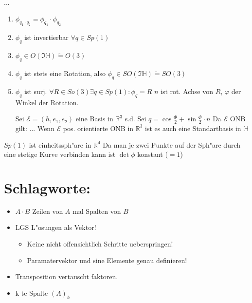\documentclass[oneside,fontsize=11pt,paper=a4,BCOR=0mm,DIV=12,automark,headsepline]{scrbook}
\theoremstyle{remark}
\theoremstyle{definition}
\theoremstyle{definition}
\theoremstyle{remark}
\begin{document}
...

\begin{relation}
  \begin{enumerate}
  \item $\phi_{q_1 \cdot q_2} = \phi_{q_1} \cdot \phi_{q_2} $
  \item $\phi_q$ ist invertierbar $\forall q \in Sp(1)$
  \item $\phi_q \in O(\Im \mathbb{H}) \tilde{=} O(3)$
  \item $\phi_q$ ist stets eine Rotation, also $\phi_q \in SO(\Im \mathbb{H})
    \tilde{=} SO(3)$  
  \item $\phi_q$ ist surj. $\forall R\in So(3) \exists q\in Sp(1): \phi_q = R$
    $n$ ist rot. Achse von $R$, $\varphi$ der Winkel der Rotation.

    Sei $\mathcal{E} = (h, e_1, e_2)$ eine Basis in $\mathbb{R}^3$ s.d.
    Sei $q=\cos \frac{\varPhi}{2} + \sin \frac{\varPhi}{2}\cdot n$ Da $\mathcal{E}$
    ONB gilt: ... Wenn $\mathcal{E}$ pos. orientierte ONB in $\mathbb{R}^3$ ist es
    auch eine Standartbasis in $\mathbb{H}$
  \end{enumerate}

$Sp(1)$ ist einheitssph"are in $\mathbb{R}^4$ Da man je zwei Punkte auf der
Sph"are durch eine stetige Kurve verbinden kann ist $\det \phi$ konstant ($=1$)
\end{relation}



\section{Schlagworte:}
\label{sec:orgcf8c685}
\begin{itemize}
\item \(A\cdot B\) Zeilen von \(A\) mal Spalten von \(B\)
\item LGS L"osungen als Vektor!
\begin{itemize}
\item Keine nicht offensichtlich Schritte ueberspringen!
\item Paramatervektor und sine Elemente genau definieren!
\end{itemize}
\item Transposition vertauscht faktoren.
\item k-te Spalte \((A)_k\)
\end{itemize}

\end{document}
